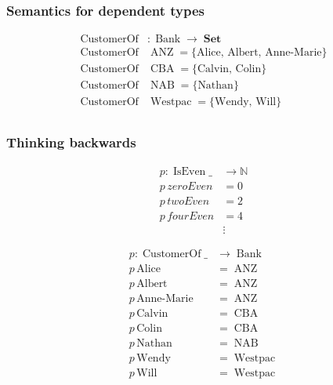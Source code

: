 \documentclass[
xcolor={usenames,dvipsnames,svgnames},
]{beamer}
\DeclareMathOperator{\Set}{\mathbf{Set}}
\DeclareMathOperator{\ANZ}{ANZ}
\DeclareMathOperator{\NAB}{NAB}
\DeclareMathOperator{\CBA}{CBA}
\DeclareMathOperator{\Westpac}{Westpac}
\DeclareMathOperator{\Bank}{Bank}
\DeclareMathOperator{\IsEven}{IsEven}
\DeclareMathOperator{\CustomerOf}{CustomerOf}
\newcommand{\N}{\ensuremath{\mathbb{N}}}
\begin{document}
  \begin{frame}
    \frametitle{Semantics for dependent types}
    \begin{align*}
      \CustomerOf&: \Bank \to \Set  \\
      \CustomerOf& \ANZ = \{ \textrm{Alice, Albert, Anne-Marie} \} \\
      \CustomerOf& \CBA = \{ \textrm{Calvin, Colin} \} \\
      \CustomerOf& \NAB = \{ \textrm{Nathan} \} \\
      \CustomerOf& \Westpac = \{ \textrm{Wendy, Will} \} \\
    \end{align*}

  \end{frame}

  \begin{frame}
    \frametitle{Thinking backwards}
    \begin{minipage}{.5\textwidth}
      \begin{align*}
        p : \IsEven \_  &\to \N\\
        p \, zeroEven &= 0 \\
        p \, twoEven &= 2 \\
        p \, fourEven &= 4 \\
        &\vdots
      \end{align*}

    \end{minipage}%
    \begin{minipage}{.5\textwidth}
      \begin{align*}
        p : \CustomerOf \_       &\to \Bank\\
        p \, \textrm{Alice}      &= \ANZ \\
        p \, \textrm{Albert}     &= \ANZ \\
        p \, \textrm{Anne-Marie} &= \ANZ \\
        p \, \textrm{Calvin}     &= \CBA \\
        p \, \textrm{Colin}      &= \CBA \\
        p \, \textrm{Nathan}     &= \NAB \\
        p \, \textrm{Wendy}      &= \Westpac \\
        p \, \textrm{Will}       &= \Westpac \\
      \end{align*}
    \end{minipage}
  \end{frame}
\end{document}
